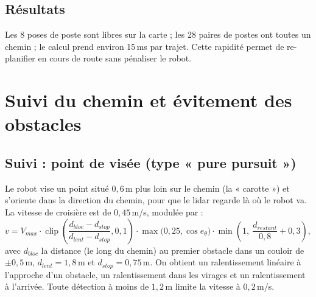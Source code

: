 \documentclass[11pt,a4paper]{article}
\begin{document}
\subsection{Résultats}
Les 8 poses de poste sont libres sur la carte ; les 28 paires de postes ont toutes un chemin ;
le calcul prend environ 15\,ms par trajet. Cette rapidité permet de re-planifier en cours de route
sans pénaliser le robot.

\section{Suivi du chemin et évitement des obstacles}

\subsection{Suivi : point de visée (type « pure pursuit »)}
Le robot vise un point situé $0{,}6$\,m plus loin sur le chemin (la « carotte ») et s'oriente dans
la direction du chemin, pour que le lidar regarde là où le robot va. La vitesse de croisière est de
$0{,}45$\,m/s, modulée par :
\begin{equation}
v = V_{max}\cdot\operatorname{clip}\!\left(\frac{d_{bloc} - d_{stop}}{d_{lent} - d_{stop}},0,1\right)
\cdot \max\!\big(0{,}25,\cos e_\theta\big)\cdot\min\!\left(1,\ \frac{d_{restant}}{0{,}8} + 0{,}3\right),
\end{equation}
avec $d_{bloc}$ la distance (le long du chemin) au premier obstacle dans un couloir de $\pm0{,}5$\,m,
$d_{lent} = 1{,}8$\,m et $d_{stop} = 0{,}75$\,m. On obtient un ralentissement linéaire à l'approche
d'un obstacle, un ralentissement dans les virages et un ralentissement à l'arrivée. Toute détection
à moins de $1{,}2$\,m limite la vitesse à $0{,}2$\,m/s.
\end{document}
